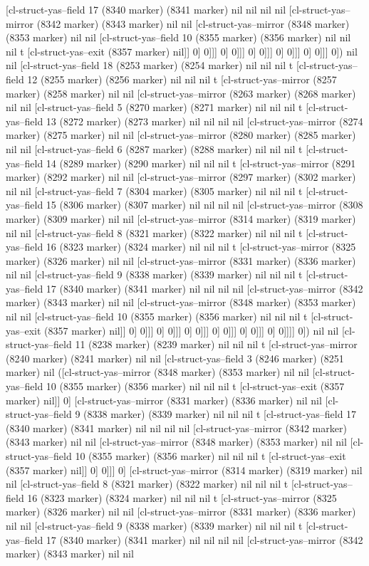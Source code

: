 {{[cl-struct-yas--field 17 (8340 marker) (8341 marker) nil nil nil nil [cl-struct-yas--mirror (8342 marker) (8343 marker) nil nil [cl-struct-yas--mirror (8348 marker) (8353 marker) nil nil [cl-struct-yas--field 10 (8355 marker) (8356 marker) nil nil nil t [cl-struct-yas--exit (8357 marker) nil]] 0] 0]]] 0] 0]]] 0] 0]]] 0] 0]]] 0] 0]]] 0]) nil nil [cl-struct-yas--field 18 (8253 marker) (8254 marker) nil nil nil t [cl-struct-yas--field 12 (8255 marker) (8256 marker) nil nil nil t [cl-struct-yas--mirror (8257 marker) (8258 marker) nil nil [cl-struct-yas--mirror (8263 marker) (8268 marker) nil nil [cl-struct-yas--field 5 (8270 marker) (8271 marker) nil nil nil t [cl-struct-yas--field 13 (8272 marker) (8273 marker) nil nil nil nil [cl-struct-yas--mirror (8274 marker) (8275 marker) nil nil [cl-struct-yas--mirror (8280 marker) (8285 marker) nil nil [cl-struct-yas--field 6 (8287 marker) (8288 marker) nil nil nil t [cl-struct-yas--field 14 (8289 marker) (8290 marker) nil nil nil t [cl-struct-yas--mirror (8291 marker) (8292 marker) nil nil [cl-struct-yas--mirror (8297 marker) (8302 marker) nil nil [cl-struct-yas--field 7 (8304 marker) (8305 marker) nil nil nil t [cl-struct-yas--field 15 (8306 marker) (8307 marker) nil nil nil nil [cl-struct-yas--mirror (8308 marker) (8309 marker) nil nil [cl-struct-yas--mirror (8314 marker) (8319 marker) nil nil [cl-struct-yas--field 8 (8321 marker) (8322 marker) nil nil nil t [cl-struct-yas--field 16 (8323 marker) (8324 marker) nil nil nil t [cl-struct-yas--mirror (8325 marker) (8326 marker) nil nil [cl-struct-yas--mirror (8331 marker) (8336 marker) nil nil [cl-struct-yas--field 9 (8338 marker) (8339 marker) nil nil nil t [cl-struct-yas--field 17 (8340 marker) (8341 marker) nil nil nil nil [cl-struct-yas--mirror (8342 marker) (8343 marker) nil nil [cl-struct-yas--mirror (8348 marker) (8353 marker) nil nil [cl-struct-yas--field 10 (8355 marker) (8356 marker) nil nil nil t [cl-struct-yas--exit (8357 marker) nil]] 0] 0]]] 0] 0]]] 0] 0]]] 0] 0]]] 0] 0]]] 0] 0]]]] 0]) nil nil [cl-struct-yas--field 11 (8238 marker) (8239 marker) nil nil nil t [cl-struct-yas--mirror (8240 marker) (8241 marker) nil nil [cl-struct-yas--field 3 (8246 marker) (8251 marker) nil ([cl-struct-yas--mirror (8348 marker) (8353 marker) nil nil [cl-struct-yas--field 10 (8355 marker) (8356 marker) nil nil nil t [cl-struct-yas--exit (8357 marker) nil]] 0] [cl-struct-yas--mirror (8331 marker) (8336 marker) nil nil [cl-struct-yas--field 9 (8338 marker) (8339 marker) nil nil nil t [cl-struct-yas--field 17 (8340 marker) (8341 marker) nil nil nil nil [cl-struct-yas--mirror (8342 marker) (8343 marker) nil nil [cl-struct-yas--mirror (8348 marker) (8353 marker) nil nil [cl-struct-yas--field 10 (8355 marker) (8356 marker) nil nil nil t [cl-struct-yas--exit (8357 marker) nil]] 0] 0]]] 0] [cl-struct-yas--mirror (8314 marker) (8319 marker) nil nil [cl-struct-yas--field 8 (8321 marker) (8322 marker) nil nil nil t [cl-struct-yas--field 16 (8323 marker) (8324 marker) nil nil nil t [cl-struct-yas--mirror (8325 marker) (8326 marker) nil nil [cl-struct-yas--mirror (8331 marker) (8336 marker) nil nil [cl-struct-yas--field 9 (8338 marker) (8339 marker) nil nil nil t [cl-struct-yas--field 17 (8340 marker) (8341 marker) nil nil nil nil [cl-struct-yas--mirror (8342 marker) (8343 marker) nil nil }}
